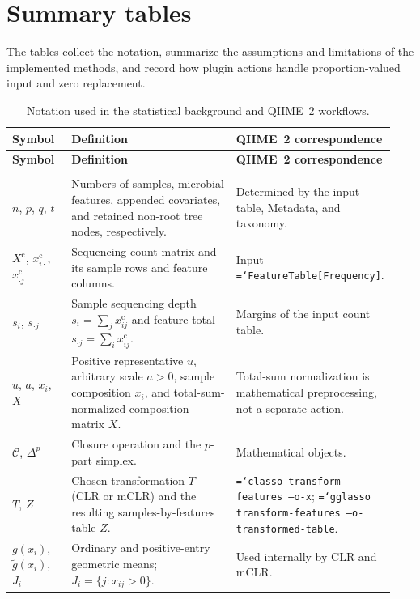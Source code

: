 \documentclass[11pt,a4paper]{article}
\newcommand{\code}[1]{\allowbreak\texttt{\hyphenchar\font=`\-\relax #1}}
\newcommand{\simplex}{\Delta}
\begin{document}
\section{Summary tables}
\label{sec:summary-tables}
The tables collect the notation, summarize the assumptions and limitations of
the implemented methods, and record how plugin actions handle
proportion-valued input and zero replacement.

\small
\begin{longtable}{@{}p{0.16\linewidth}p{0.50\linewidth}p{0.28\linewidth}@{}}
\caption{Notation used in the statistical background and QIIME~2 workflows.}
\label{tab:notation}\\
\toprule
\textbf{Symbol} & \textbf{Definition} & \textbf{QIIME~2 correspondence} \\
\midrule
\endfirsthead
\toprule
\textbf{Symbol} & \textbf{Definition} & \textbf{QIIME~2 correspondence} \\
\midrule
\endhead
\bottomrule
\endfoot
\multicolumn{3}{@{}l}{\textit{Data, compositions, and transformations}} \\
$n$, $p$, $q$, $t$ & Numbers of samples, microbial features, appended covariates, and retained non-root tree nodes, respectively. & Determined by the input table, Metadata, and taxonomy. \\
$X^{\mathrm{c}}$, $x^{\mathrm{c}}_{i\cdot}$, $x^{\mathrm{c}}_{\cdot j}$ & Sequencing count matrix and its sample rows and feature columns. & Input \code{FeatureTable[Frequency]}. \\
$s_i$, $s_{\cdot j}$ & Sample sequencing depth $s_i=\sum_jx^{\mathrm{c}}_{ij}$ and feature total $s_{\cdot j}=\sum_i x^{\mathrm{c}}_{ij}$. & Margins of the input count table. \\
$u$, $a$, $x_i$, $X$ & Positive representative $u$, arbitrary scale $a>0$, sample composition $x_i$, and total-sum-normalized composition matrix $X$. & Total-sum normalization is mathematical preprocessing, not a separate action. \\
$\mathcal{C}$, $\simplex^p$ & Closure operation and the $p$-part simplex. & Mathematical objects. \\
$T$, $Z$ & Chosen transformation $T$ (CLR or mCLR) and the resulting samples-by-features table $Z$. & \code{classo transform-features --o-x}; \code{gglasso transform-features --o-transformed-table}. \\
$g(x_i)$, $\widetilde g(x_i)$, $J_i$ & Ordinary and positive-entry geometric means; $J_i=\{j:x_{ij}>0\}$. & Used internally by CLR and mCLR. \\

\end{longtable}
\end{document}

